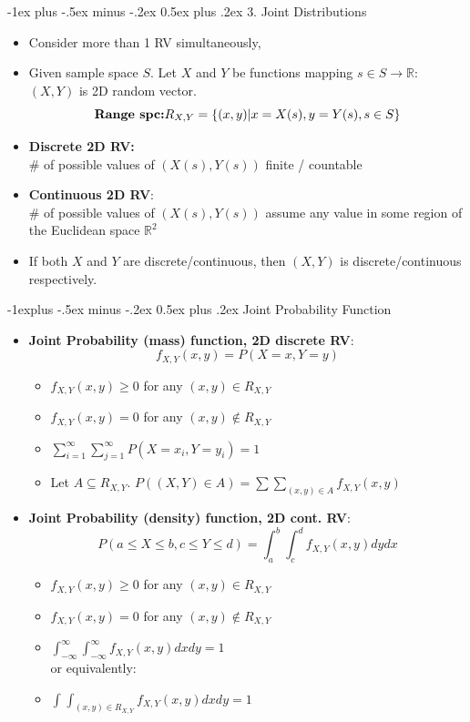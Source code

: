 \documentclass[12pt, landscape]{article}
\makeatletter
\renewcommand{\section}{\@startsection{section}{1}{0mm}%
                                {-1ex plus -.5ex minus -.2ex}%
                                {0.5ex plus .2ex}%
                                {\normalfont\large\bfseries}}
\renewcommand{\subsection}{\@startsection{subsection}{2}{0.1mm}%
                                {-1explus -.5ex minus -.2ex}%
                                {0.5ex plus .2ex}%
                                {\normalfont\normalsize\bfseries}}
\makeatother
\begin{document}
\begin{multicols*}{3}
    
\section{3. Joint Distributions}
\begin{itemize}
    \item Consider more than 1 RV simultaneously, 
    \item Given sample space $S$. Let $X$ and $Y$ be functions mapping $s \in S \to \mathbb{R}$: $(X, Y)$ is 2D random vector.
    \[\text{\textbf{Range spc:}} R_{X, Y} = \{(x,y) | x = X(s), y=Y(s), s \in S\}\]
    \item \textbf{Discrete 2D RV:} \\
    {\# of possible values of $(X(s), Y(s))$ finite / countable}
    \item \textbf{Continuous 2D RV}:  \\
    	{\# of possible values of $(X(s), Y(s))$ assume any value in some region of the Euclidean space $\mathbb{R}^2$}
    \item If both $X$ and $Y$ are discrete/continuous, then $(X, Y)$ is discrete/continuous respectively.
\end{itemize}

\subsection{Joint Probability Function}

\begin{itemize}
     \item \textbf{Joint Probability (mass) function, 2D discrete RV}:
    \[f_{X,Y} (x,y) = P(X = x, Y = y)\]
    \begin{itemize}
        \item $f_{X,Y} (x,y) \geq 0$ for any $(x,y) \in R_{X,Y}$
        \item $f_{X,Y} (x,y) = 0$ for any $(x,y) \notin R_{X,Y}$
        \item $\sum _{i=1} ^{\infty} \sum _{j=1} ^{\infty} P(X = x_i, Y = y_i) = 1$
        \item Let $A \subseteq R_{X, Y}$. $P((X,Y) \in A) = \sum \sum _{(x,y) \in A} f_{X, Y}(x,y)$
    \end{itemize}
     \item \textbf{Joint Probability (density) function, 2D cont. RV}:
    \[P(a \leq X \leq b, c \leq Y \leq d) = \int _a ^b \int _c ^d f_{X, Y} (x, y)dydx\]
    \begin{itemize}
        \item $f_{X,Y} (x,y) \geq 0$ for any $(x,y) \in R_{X,Y}$
        \item $f_{X,Y} (x,y) = 0$ for any $(x,y) \notin R_{X,Y}$
        \item $\int _{-\infty} ^{\infty} \int _{-\infty} ^{\infty} f_{X,Y} (x,y)dxdy = 1$ \\
        or equivalently:
        \item $\int _{} ^{} \int _{(x,y) \in R_{X,Y}} ^{} f_{X,Y} (x,y)dxdy = 1$
    \end{itemize}
\end{itemize}


\end{multicols*}
\end{document}
